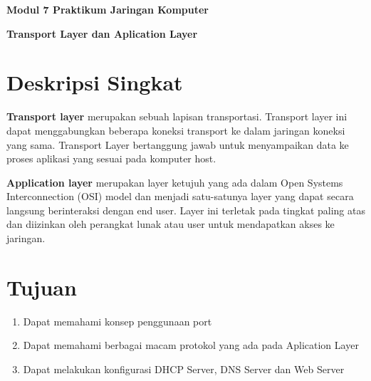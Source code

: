 \documentclass{article}
\begin{document}
    \begin{center}
        \textbf{Modul 7 Praktikum Jaringan Komputer}

        \textbf{Transport Layer dan Aplication Layer}
    \end{center}

    \section*{Deskripsi Singkat}

    \begin{flushleft}
        \textbf{Transport layer} merupakan sebuah lapisan transportasi. 
        Transport layer ini dapat menggabungkan beberapa koneksi transport ke dalam jaringan koneksi yang sama. 
        Transport Layer bertanggung jawab untuk menyampaikan data ke proses aplikasi yang sesuai pada komputer host.
        \newline

        \textbf{Application layer} merupakan layer ketujuh yang ada dalam Open Systems Interconnection (OSI) model dan menjadi satu-satunya layer yang dapat secara langsung berinteraksi dengan end user. 
        Layer ini terletak pada tingkat paling atas dan diizinkan oleh perangkat lunak atau user untuk mendapatkan akses ke jaringan. 
    \end{flushleft}

    \section*{Tujuan}
    \begin{enumerate}
        \item Dapat memahami konsep penggunaan port
        \item Dapat memahami berbagai macam protokol yang ada pada Aplication Layer
        \item Dapat melakukan konfigurasi DHCP Server, DNS Server dan Web Server
    \end{enumerate}
\end{document}
